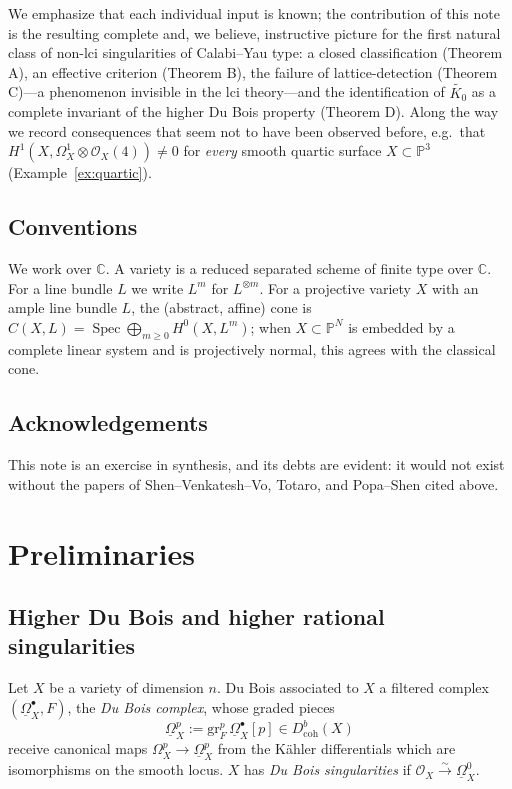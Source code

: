 \documentclass[11pt]{amsart}
\numberwithin{equation}{section}
\theoremstyle{plain}
\theoremstyle{definition}
\theoremstyle{remark}
\newcommand{\CC}{\mathbb{C}}
\newcommand{\PP}{\mathbb{P}}
\newcommand{\cO}{\mathcal{O}}
\newcommand{\DuBois}[1]{\underline{\Omega}^{#1}}
\newcommand{\Spec}{\operatorname{Spec}}
\newcommand{\Kzero}{K_0}
\begin{document}
We emphasize that each individual input is known; the contribution of this note is the resulting complete and, we believe, instructive picture for the first natural class of non-lci singularities of Calabi--Yau type: a closed classification (Theorem A), an effective criterion (Theorem B), the failure of lattice-detection (Theorem C)---a phenomenon invisible in the lci theory---and the identification of $\widetilde{\Kzero}$ as a complete invariant of the higher Du Bois property (Theorem D).
Along the way we record consequences that seem not to have been observed before, e.g.\ that $H^1(X,\Omega^1_X\otimes\cO_X(4))\ne0$ for \emph{every} smooth quartic surface $X\subset\PP^3$ (Example~\ref{ex:quartic}).

\subsection*{Conventions}
We work over $\CC$. A variety is a reduced separated scheme of finite type over $\CC$.
For a line bundle $L$ we write $L^m$ for $L^{\otimes m}$.
For a projective variety $X$ with an ample line bundle $L$, the (abstract, affine) cone is $C(X,L)=\Spec\bigoplus_{m\ge0}H^0(X,L^m)$; when $X\subset\PP^N$ is embedded by a complete linear system and is projectively normal, this agrees with the classical cone.

\subsection*{Acknowledgements}
This note is an exercise in synthesis, and its debts are evident: it would not exist without the papers of Shen--Venkatesh--Vo, Totaro, and Popa--Shen cited above.

\section{Preliminaries}\label{sec:prelim}

\subsection{Higher Du Bois and higher rational singularities}
Let $X$ be a variety of dimension $n$. Du Bois \cite{DB} associated to $X$ a filtered complex $(\DuBois{\bullet}_X,F)$, the \emph{Du Bois complex}, whose graded pieces
\[
\DuBois{p}_X:=\mathrm{gr}^p_F\,\DuBois{\bullet}_X[p]\in D^b_{\mathrm{coh}}(X)
\]
receive canonical maps $\Omega^p_X\to\DuBois{p}_X$ from the K\"ahler differentials which are isomorphisms on the smooth locus.
$X$ has \emph{Du Bois singularities} if $\cO_X\xrightarrow{\sim}\DuBois{0}_X$.
\end{document}
